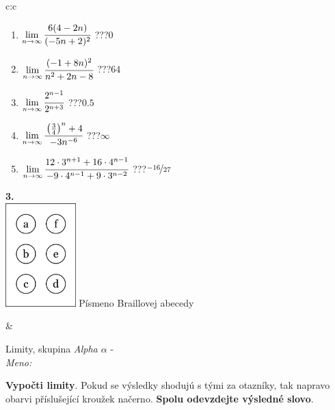 \documentclass[10pt]{report}
\begin{document}
\begin{tabular}{c:c}
\begin{minipage}[c][104.5mm][t]{0.5\linewidth}
\begin{center}
\begin{minipage}{0.79\linewidth}
\begin{center}
\begin{varwidth}{\linewidth}
\begin{enumerate}
\item $\lim\limits_{n\to\infty}\cfrac{6(4-2n)}{(-5n+2)^2}$\quad \dotfill\; ???\;\dotfill \quad $0$
\item $\lim\limits_{n\to\infty}\cfrac{(-1+8n)^2}{n^2+2n-8}$\quad \dotfill\; ???\;\dotfill \quad $64$
\item $\lim\limits_{n\to\infty}\cfrac{2^{n-1}}{2^{n+3}}$\quad \dotfill\; ???\;\dotfill \quad $0.5$
\item $\lim\limits_{n\to\infty}\cfrac{\left(\frac{3}{4}\right)^n +4}{-3n^{-6}}$\quad \dotfill\; ???\;\dotfill \quad $\infty$
\item $\lim\limits_{n\to\infty}\cfrac{12\cdot 3^{n+1}+16\cdot 4^{n-1}}{-9\cdot 4^{n-1}+9\cdot 3^{n-2}}$\quad \dotfill\; ???\;\dotfill \quad $\nicefrac{-16}{27}$
\end{enumerate}
\end{varwidth}
\end{center}
\end{minipage}
\begin{minipage}{0.20\linewidth}
\begin{center}
{\Huge\bfseries 3.} \\[2mm]
\includegraphics[height=40mm]{../images/braille.png}
{\small Písmeno Braillovej abecedy}
\end{center}
\end{minipage}
\end{center}
\end{minipage}
&
\begin{minipage}[c][104.5mm][t]{0.5\linewidth}
\begin{center}
\vspace{7mm}
{\huge Limity, skupina \textit{Alpha $\alpha$} -}\\[5mm]
\textit{Meno:}\phantom{xxxxxxxxxxxxxxxxxxxxxxxxxxxxxxxxxxxxxxxxxxxxxxxxxxxxxxxxxxxxxxxxx}\\[5mm]
\begin{minipage}{0.95\linewidth}
\begin{center}
\textbf{Vypočti limity}. Pokud se výsledky shodujú s tými za otazníky, tak napravo\\obarvi příslušející kroužek načerno. \textbf{Spolu odevzdejte výsledné slovo}.

\end{center}
\end{minipage}
\end{center}
\end{minipage}
\end{tabular}
\end{document}
